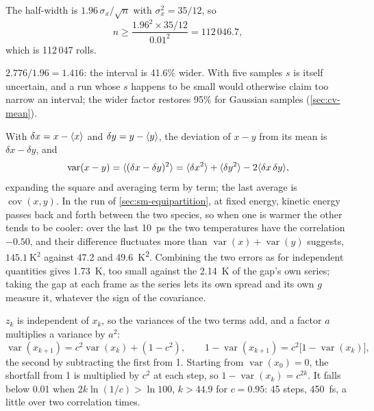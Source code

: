 \label{sec:cv-solutions}

The half-width is $1.96\,\sigma_x/\sqrt n$ with
$\sigma_x^2 = 35/12$, so
\begin{equation*}
   n \ge \frac{1.96^2\times35/12}{0.01^2} = 112\,046.7 ,
\end{equation*}
which is 112\,047 rolls.

$2.776/1.96 = 1.416$: the interval is 41.6\%
wider. With five samples $s$ is itself uncertain, and a run whose $s$
happens to be small would otherwise claim too narrow an interval; the
wider factor restores 95\% for Gaussian samples (\cref{sec:cv-mean}).

With $\delta x = x - \langle x \rangle$ and $\delta y = y -
\langle y \rangle$, the deviation of $x - y$ from its mean is $\delta x - \delta y$,
and
\begin{equation*}
   \operatorname{var}(x - y) = \langle (\delta x - \delta y)^2 \rangle
   = \langle \delta x^2 \rangle + \langle \delta y^2 \rangle - 2\langle \delta x\,\delta y \rangle ,
\end{equation*}
expanding the square and averaging term by term; the last average is
$\operatorname{cov}(x, y)$. In the run of \cref{sec:sm-equipartition}, at
fixed energy, kinetic energy passes back and forth between the two
species, so when one is warmer the other tends to be cooler: over the last
\SI{10}{\pico\second} the two temperatures have the correlation $-0.50$,
and their difference fluctuates more than $\operatorname{var}(x) +
\operatorname{var}(y)$ suggests, $\SI{145.1}{\kelvin\squared}$ against
47.2 and \SI{49.6}{\kelvin\squared}. Combining the two errors as for
independent quantities gives \SI{1.73}{\kelvin}, too small against the
\SI{2.14}{\kelvin} of the gap's own series; taking the gap at each frame
as the series lets its own spread and its own $g$ measure it, whatever
the sign of the covariance.

$z_k$ is independent of $x_k$, so the variances of
the two terms add, and a factor $a$ multiplies a variance by $a^2$:
\begin{equation*}
   \operatorname{var}(x_{k+1}) = c^2\operatorname{var}(x_k) + (1 - c^2) ,
   \qquad 1 - \operatorname{var}(x_{k+1}) = c^2\bigl[1 -
   \operatorname{var}(x_k)\bigr] ,
\end{equation*}
the second by subtracting the first from 1. Starting from
$\operatorname{var}(x_0) = 0$, the shortfall from 1 is multiplied by $c^2$
at each step, so $1 - \operatorname{var}(x_k) = c^{2k}$. It falls below
0.01 when $2k\ln(1/c) > \ln100$, $k > 44.9$ for $c = 0.95$: 45 steps,
\SI{450}{\femto\second}, a little over two correlation times.

